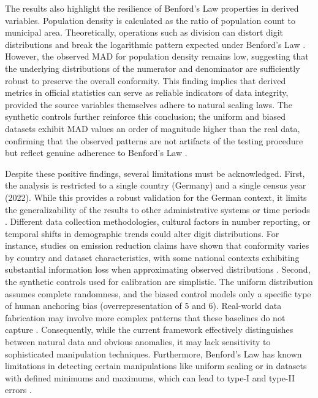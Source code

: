\documentclass[11pt,a4paper]{article}
\begin{document}
The results also highlight the resilience of Benford's Law properties in derived variables. Population density is calculated as the ratio of population count to municipal area. Theoretically, operations such as division can distort digit distributions and break the logarithmic pattern expected under Benford's Law \cite{Azevedo2021ABL}. However, the observed MAD for population density remains low, suggesting that the underlying distributions of the numerator and denominator are sufficiently robust to preserve the overall conformity. This finding implies that derived metrics in official statistics can serve as reliable indicators of data integrity, provided the source variables themselves adhere to natural scaling laws. The synthetic controls further reinforce this conclusion; the uniform and biased datasets exhibit MAD values an order of magnitude higher than the real data, confirming that the observed patterns are not artifacts of the testing procedure but reflect genuine adherence to Benford's Law \cite{Silva2024ANA}.

Despite these positive findings, several limitations must be acknowledged. First, the analysis is restricted to a single country (Germany) and a single census year (2022). While this provides a robust validation for the German context, it limits the generalizability of the results to other administrative systems or time periods \cite{Ivanova2025BenfordsLA}. Different data collection methodologies, cultural factors in number reporting, or temporal shifts in demographic trends could alter digit distributions. For instance, studies on emission reduction claims have shown that conformity varies by country and dataset characteristics, with some national contexts exhibiting substantial information loss when approximating observed distributions \cite{Cole2019TestingTE}. Second, the synthetic controls used for calibration are simplistic. The uniform distribution assumes complete randomness, and the biased control models only a specific type of human anchoring bias (overrepresentation of 5 and 6). Real-world data fabrication may involve more complex patterns that these baselines do not capture \cite{Schumm2023CanRS}. Consequently, while the current framework effectively distinguishes between natural data and obvious anomalies, it may lack sensitivity to sophisticated manipulation techniques. Furthermore, Benford's Law has known limitations in detecting certain manipulations like uniform scaling or in datasets with defined minimums and maximums, which can lead to type-I and type-II errors \cite{Cole2019TestingTE}.
\end{document}
